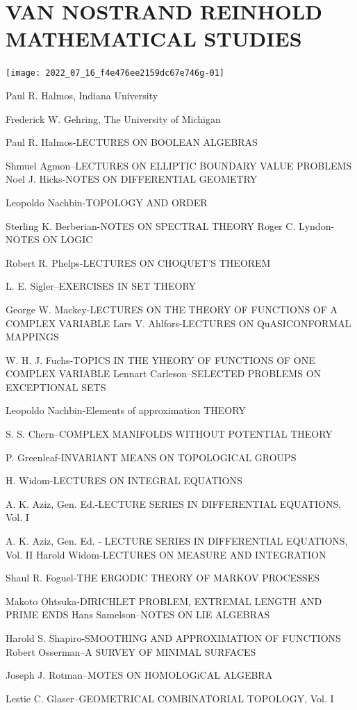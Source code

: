 \documentclass[10pt]{article}
\begin{document}
\section{VAN NOSTRAND REINHOLD MATHEMATICAL STUDIES}
\texttt{[image: 2022\_07\_16\_f4e476ee2159dc67e746g-01]}

Paul R. Halmos, Indiana University

Frederick W. Gehring, The University of Michigan

Paul R. Halmos-LECTURES ON BOOLEAN ALGEBRAS

Shmuel Agmon–LECTURES ON ELLIPTIC BOUNDARY VALUE PROBLEMS Noel J. Hicks-NOTES ON DIFFERENTIAL GEOMETRY

Leopoldo Nachbin-TOPOLOGY AND ORDER

Sterling K. Berberian-NOTES ON SPECTRAL THEORY Roger C. Lyndon-NOTES ON LOGIC

Robert R. Phelps-LECTURES ON CHOQUET'S THEOREM

L. E. Sigler–EXERCISES IN SET THEORY

George W. Mackey-LECTURES ON THE THEORY OF FUNCTIONS OF A COMPLEX VARIABLE Lars V. Ahlfors-LECTURES ON QuASICONFORMAL MAPPINGS

W. H. J. Fuchs-TOPICS IN THE YHEORY OF FUNCTIONS OF ONE COMPLEX VARIABLE Lennart Carleson–SELECTED PROBLEMS ON EXCEPTIONAL SETS

Leopoldo Nachbin-Elements of approximation THEORY

S. S. Chern–COMPLEX MANIFOLDS WITHOUT POTENTIAL THEORY

P. Greenleaf-INVARIANT MEANS ON TOPOLOGICAL GROUPS

H. Widom-LECTURES ON INTEGRAL EQUATIONS

A. K. Aziz, Gen. Ed.-LECTURE SERIES IN DIFFERENTIAL EQUATIONS, Vol. I

A. K. Aziz, Gen. Ed. - LECTURE SERIES IN DIFFERENTIAL EQUATIONS, Vol. II Harold Widom-LECTURES ON MEASURE AND INTEGRATION

Shaul R. Foguel-THE ERGODIC THEORY OF MARKOV PROCESSES

Makoto Ohtsuka-DIRICHLET PROBLEM, EXTREMAL LENGTH AND PRIME ENDS Hans Samelson–NOTES ON LIE ALGEBRAS

Harold S. Shapiro-SMOOTHING AND APPROXIMATION OF FUNCTIONS Robert Osserman–A SURVEY OF MINIMAL SURFACES

Joseph J. Rotman–MOTES ON HOMOLOGiCAL ALGEBRA

Lestie C. Glaser–GEOMETRICAL COMBINATORIAL TOPOLOGY, Vol. I
\end{document}
